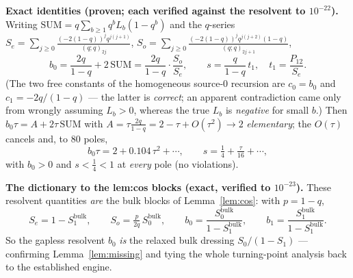 \begin{remark}
\textbf{Exact identities (proven; each verified against the resolvent to $10^{-22}$).} Writing
$\mathrm{SUM}=q\sum_{b\ge1}q^bL_b(1-q^b)$ and the $q$-series
$S_e=\sum_{j\ge0}\frac{(-2(1-q))^jq^{j(j+1)}}{(q;q)_{2j}}$,
$S_o=\sum_{j\ge0}\frac{(-2(1-q))^jq^{j(j+2)}(1-q)}{(q;q)_{2j+1}}$,
\[
   b_0=\frac{2q}{1-q}+2\,\mathrm{SUM}=\frac{2q}{1-q}\cdot\frac{S_o}{S_e},\qquad
   s=\frac{q}{1-q}\,t_1,\quad t_1=\frac{P_{12}}{S_e}.
\]
(The two free constants of the homogeneous source-$0$ recursion are $c_0=b_0$ and $c_1=-2q/(1-q)$ --- the
latter is \emph{correct}; an apparent contradiction came only from wrongly assuming $L_b>0$, whereas the true
$L_b$ is \emph{negative} for small $b$.) Then $b_0\tau=A+2\tau\,\mathrm{SUM}$ with $A=\tau\frac{2q}{1-q}=2-\tau
+O(\tau^2)\to2$ \emph{elementary}; the $O(\tau)$ cancels and, to $80$ poles,
\[
   b_0\tau=2+0.104\,\tau^2+\cdots,\qquad s=\tfrac14+\tfrac\tau{16}+\cdots,
\]
with $b_0>0$ and $s<\tfrac14<1$ at \emph{every} pole (no violations).

\textbf{The dictionary to the lem:cos blocks (exact, verified to $10^{-23}$).} These resolvent quantities
\emph{are} the bulk blocks of Lemma~\ref{lem:cos}: with $p=1-q$,
\[
   S_e=1-S_1^{\mathrm{bulk}},\qquad S_o=\tfrac{p}{2q}\,S_0^{\mathrm{bulk}},\qquad
   b_0=\frac{S_0^{\mathrm{bulk}}}{1-S_1^{\mathrm{bulk}}},\qquad b_1=\frac{S_1^{\mathrm{bulk}}}{1-S_1^{\mathrm{bulk}}} .
\]
So the gapless resolvent $b_0$ \emph{is} the relaxed bulk dressing $S_0/(1-S_1)$ ---
confirming Lemma~\ref{lem:missing} and tying the whole turning-point analysis back to the established engine.


\end{remark}
